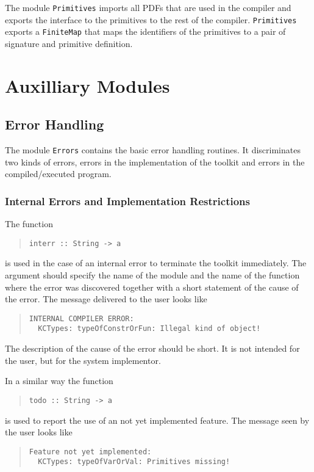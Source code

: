 \documentclass{report}
\newcommand{\code}[1]{\texttt{#1}}
\begin{document}
The module \code{Primitives} imports all PDFs that are used in the compiler and
exports the interface to the primitives to the rest of the
compiler. \code{Primitives} exports a \code{FiniteMap} that maps the
identifiers of the primitives to a pair of signature and primitive definition.

\chapter{Auxilliary Modules}
\label{cha:aux}

\section{Error Handling}

The module \code{Errors} contains the basic error handling routines. It
discriminates two kinds of errors, errors in the implementation of the toolkit
and errors in the compiled/executed program. 

\subsection{Internal Errors and Implementation Restrictions}

The function
%
\begin{quote}
\begin{verbatim}
interr :: String -> a
\end{verbatim}
\end{quote}
%
is used in the case of an internal error to terminate the toolkit
immediately. The argument should specify the name of the module and the name of
the function where the error was discovered together with a short statement of
the cause of the error. The message delivered to the user looks like
%
\begin{quote}
\begin{verbatim}
INTERNAL COMPILER ERROR:
  KCTypes: typeOfConstrOrFun: Illegal kind of object!
\end{verbatim}
\end{quote}
%
The description of the cause of the error should be short. It is not intended
for the user, but for the system implementor.

In a similar way the function
%
\begin{quote}
\begin{verbatim}
todo :: String -> a
\end{verbatim}
\end{quote}
%
is used to report the use of an not yet implemented feature. The message seen
by the user looks like
%
\begin{quote}
\begin{verbatim}
Feature not yet implemented:
  KCTypes: typeOfVarOrVal: Primitives missing!
\end{verbatim}
\end{quote}
\end{document}
